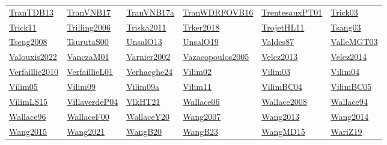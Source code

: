 \begin{longtable}{*{6}{l}}
\hyperref[detail:TranTDB13]{TranTDB13} & \hyperref[detail:TranVNB17]{TranVNB17} & \hyperref[detail:TranVNB17a]{TranVNB17a} & \hyperref[detail:TranWDRFOVB16]{TranWDRFOVB16} & \hyperref[detail:TrentesauxPT01]{TrentesauxPT01} & \hyperref[detail:Trick03]{Trick03}\\ 
\hyperref[detail:Trick11]{Trick11} & \hyperref[detail:Trilling2006]{Trilling2006} & \hyperref[detail:Triska2011]{Triska2011} & \hyperref[detail:Trker2018]{Trker2018} & \hyperref[detail:TrojetHL11]{TrojetHL11} & \hyperref[detail:Tsang03]{Tsang03}\\ 
\hyperref[detail:Tseng2008]{Tseng2008} & \hyperref[detail:TsurutaS00]{TsurutaS00} & \hyperref[detail:UnsalO13]{UnsalO13} & \hyperref[detail:UnsalO19]{UnsalO19} & \hyperref[detail:Valdes87]{Valdes87} & \hyperref[detail:ValleMGT03]{ValleMGT03}\\ 
\hyperref[detail:Valouxis2022]{Valouxis2022} & \hyperref[detail:VanczaM01]{VanczaM01} & \hyperref[detail:Varnier2002]{Varnier2002} & \hyperref[detail:Vazacopoulos2005]{Vazacopoulos2005} & \hyperref[detail:Velez2013]{Velez2013} & \hyperref[detail:Velez2014]{Velez2014}\\ 
\hyperref[detail:Verfaillie2010]{Verfaillie2010} & \hyperref[detail:VerfaillieL01]{VerfaillieL01} & \hyperref[detail:Verhaeghe24]{Verhaeghe24} & \hyperref[detail:Vilim02]{Vilim02} & \hyperref[detail:Vilim03]{Vilim03} & \hyperref[detail:Vilim04]{Vilim04}\\ 
\hyperref[detail:Vilim05]{Vilim05} & \hyperref[detail:Vilim09]{Vilim09} & \hyperref[detail:Vilim09a]{Vilim09a} & \hyperref[detail:Vilim11]{Vilim11} & \hyperref[detail:VilimBC04]{VilimBC04} & \hyperref[detail:VilimBC05]{VilimBC05}\\ 
\hyperref[detail:VilimLS15]{VilimLS15} & \hyperref[detail:VillaverdeP04]{VillaverdeP04} & \hyperref[detail:VlkHT21]{VlkHT21} & \hyperref[detail:Wallace06]{Wallace06} & \hyperref[detail:Wallace2008]{Wallace2008} & \hyperref[detail:Wallace94]{Wallace94}\\ 
\hyperref[detail:Wallace96]{Wallace96} & \hyperref[detail:WallaceF00]{WallaceF00} & \hyperref[detail:WallaceY20]{WallaceY20} & \hyperref[detail:Wang2007]{Wang2007} & \hyperref[detail:Wang2013]{Wang2013} & \hyperref[detail:Wang2014]{Wang2014}\\ 
\hyperref[detail:Wang2015]{Wang2015} & \hyperref[detail:Wang2021]{Wang2021} & \hyperref[detail:WangB20]{WangB20} & \hyperref[detail:WangB23]{WangB23} & \hyperref[detail:WangMD15]{WangMD15} & \hyperref[detail:WariZ19]{WariZ19}\\ 

\end{longtable}
